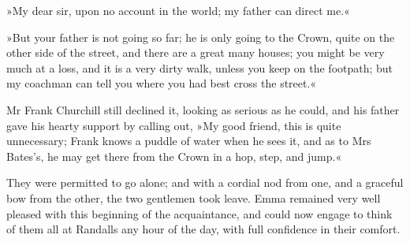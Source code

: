 »My dear sir, upon no account in the world; my father can direct me.«

»But your father is not going so far; he is only going to the Crown, quite on the other side of the street, and there are a great many houses; you might be very much at a loss, and it is a very dirty walk, unless you keep on the footpath; but my coachman can tell you where you had best cross the street.«

Mr Frank Churchill still declined it, looking as serious as he could, and his father gave his hearty support by calling out, »My good friend, this is quite unnecessary; Frank knows a puddle of water when he sees it, and as to Mrs Bates's, he may get there from the Crown in a hop, step, and jump.«

They were permitted to go alone; and with a cordial nod from one, and a graceful bow from the other, the two gentlemen took leave. Emma remained very well pleased with this beginning of the acquaintance, and could now engage to think of them all at Randalls any hour of the day, with full confidence in their comfort.